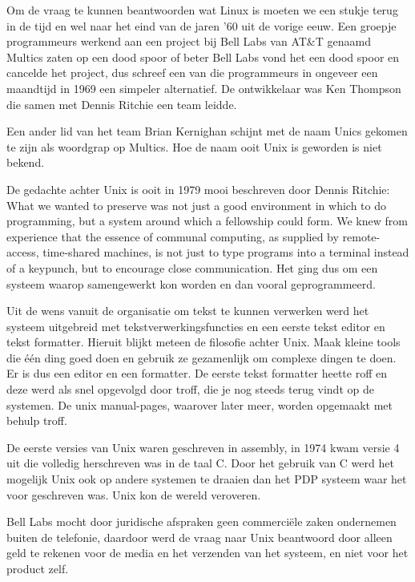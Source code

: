 Om de vraag te kunnen beantwoorden wat Linux is moeten we een stukje terug in de tijd en wel naar het eind van de jaren '60 uit de vorige eeuw. Een groepje programmeurs werkend aan een project bij Bell Labs van AT\&T genaamd Multics zaten op een dood spoor of beter Bell Labs vond het een dood spoor en cancelde het project, dus schreef een van die programmeurs in ongeveer een maandtijd in 1969 een simpeler alternatief. De ontwikkelaar was Ken Thompson die samen met Dennis Ritchie een team leidde.\par

Een ander lid van het team Brian Kernighan schijnt met de naam Unics gekomen te zijn als woordgrap op Multics. Hoe de naam ooit Unix is geworden is niet bekend.\par

De gedachte achter Unix is ooit in 1979 mooi beschreven door Dennis Ritchie:
What we wanted to preserve was not just a good environment in which to do programming, but a system around which a fellowship could form. We knew from experience that the essence of communal computing, as supplied by remote-access, time-shared machines, is not just to type programs into a terminal instead of a keypunch, but to encourage close communication.
Het ging dus om een systeem waarop samengewerkt kon worden en dan vooral geprogrammeerd.\par

Uit de wens vanuit de organisatie om tekst te kunnen verwerken werd het systeem uitgebreid met tekstverwerkingsfuncties
en een eerste tekst editor en tekst formatter. Hieruit blijkt meteen de filosofie achter Unix. Maak kleine tools die
\'e\'en ding goed doen en gebruik ze gezamenlijk om complexe dingen te doen. Er is dus een editor en een formatter. De
eerste tekst formatter heette roff en deze werd als snel opgevolgd door troff, die je nog steeds terug vindt op de
systemen. De unix manual-pages, waarover later meer, worden opgemaakt met behulp troff.\par

De eerste versies van Unix waren geschreven in assembly, in 1974 kwam versie 4 uit die volledig herschreven was in de
taal C. Door het gebruik van C werd het mogelijk Unix ook op andere systemen te draaien dan het PDP systeem
waar het voor geschreven was. Unix kon de wereld veroveren.\par

Bell Labs mocht door juridische afspraken geen commerci\"ele zaken ondernemen buiten de telefonie, daardoor werd de
vraag naar Unix beantwoord door alleen geld te rekenen voor de media en het verzenden van het systeem, en niet voor het
product zelf.\par

